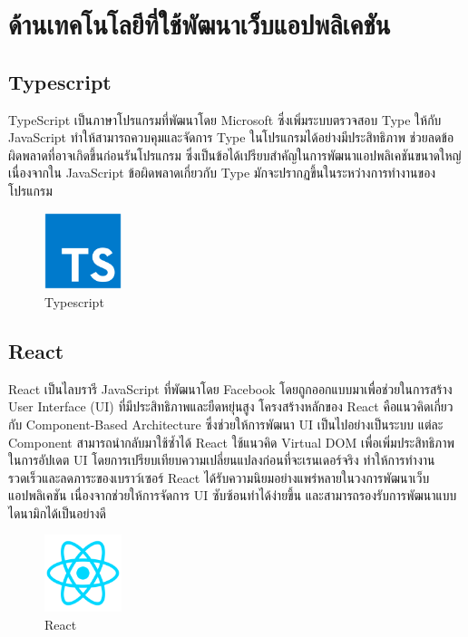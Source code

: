 \newpage
\section{ด้านเทคโนโลยีที่ใช้พัฒนาเว็บแอปพลิเคชัน}
\subsection{Typescript}
TypeScript เป็นภาษาโปรแกรมที่พัฒนาโดย Microsoft ซึ่งเพิ่มระบบตรวจสอบ Type ให้กับ JavaScript ทำให้สามารถควบคุมและจัดการ Type ในโปรแกรมได้อย่างมีประสิทธิภาพ ช่วยลดข้อผิดพลาดที่อาจเกิดขึ้นก่อนรันโปรแกรม ซึ่งเป็นข้อได้เปรียบสำคัญในการพัฒนาแอปพลิเคชันขนาดใหญ่ เนื่องจากใน JavaScript ข้อผิดพลาดเกี่ยวกับ Type มักจะปรากฏขึ้นในระหว่างการทำงานของโปรแกรม \cite{aiw}

\begin{figure}[H]
  \begin{center}
  \includegraphics[width=0.2\textwidth]{typescript_original_logo_icon_146317.png}
  \end{center}
  \caption[Typescript]{Typescript}
\end{figure}
\subsection{React}
React เป็นไลบรารี JavaScript ที่พัฒนาโดย Facebook โดยถูกออกแบบมาเพื่อช่วยในการสร้าง User Interface (UI) ที่มีประสิทธิภาพและยืดหยุ่นสูง โครงสร้างหลักของ React คือแนวคิดเกี่ยวกับ Component-Based Architecture ซึ่งช่วยให้การพัฒนา UI เป็นไปอย่างเป็นระบบ แต่ละ Component สามารถนำกลับมาใช้ซ้ำได้ React ใช้แนวคิด Virtual DOM เพื่อเพิ่มประสิทธิภาพในการอัปเดต UI โดยการเปรียบเทียบความเปลี่ยนแปลงก่อนที่จะเรนเดอร์จริง ทำให้การทำงานรวดเร็วและลดภาระของเบราว์เซอร์ React ได้รับความนิยมอย่างแพร่หลายในวงการพัฒนาเว็บแอปพลิเคชัน เนื่องจากช่วยให้การจัดการ UI ซับซ้อนทำได้ง่ายขึ้น และสามารถรองรับการพัฒนาแบบไดนามิกได้เป็นอย่างดี \cite{aiw2}
\begin{figure}[H]
  \begin{center}
  \includegraphics[width=0.2\textwidth]{1174949_js_react js_logo_react_react native_icon.png}
  \end{center}
  \caption[React]{React}
\end{figure}


